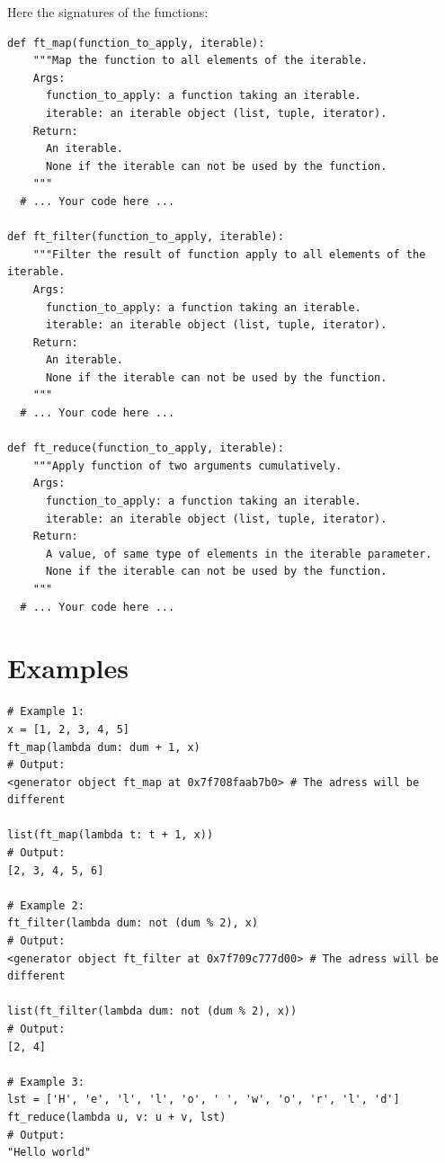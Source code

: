 \documentclass{42-en}
\begin{document}
Here the signatures of the functions:

\begin{verbatim}
def ft_map(function_to_apply, iterable):
	"""Map the function to all elements of the iterable.
	Args:
	  function_to_apply: a function taking an iterable.
	  iterable: an iterable object (list, tuple, iterator).
	Return:
	  An iterable.
	  None if the iterable can not be used by the function.
	"""
  # ... Your code here ...

def ft_filter(function_to_apply, iterable):
	"""Filter the result of function apply to all elements of the iterable.
	Args:
	  function_to_apply: a function taking an iterable.
	  iterable: an iterable object (list, tuple, iterator).
	Return:
	  An iterable.
	  None if the iterable can not be used by the function.
	"""
  # ... Your code here ...

def ft_reduce(function_to_apply, iterable):
	"""Apply function of two arguments cumulatively.
	Args:
	  function_to_apply: a function taking an iterable.
	  iterable: an iterable object (list, tuple, iterator).
	Return:
	  A value, of same type of elements in the iterable parameter.
	  None if the iterable can not be used by the function.
	"""
  # ... Your code here ...
\end{verbatim}

\section*{Examples}

\begin{verbatim}
# Example 1:
x = [1, 2, 3, 4, 5]
ft_map(lambda dum: dum + 1, x)
# Output:
<generator object ft_map at 0x7f708faab7b0> # The adress will be different

list(ft_map(lambda t: t + 1, x))
# Output:
[2, 3, 4, 5, 6]

# Example 2:
ft_filter(lambda dum: not (dum % 2), x)
# Output:
<generator object ft_filter at 0x7f709c777d00> # The adress will be different

list(ft_filter(lambda dum: not (dum % 2), x))
# Output:
[2, 4]

# Example 3:
lst = ['H', 'e', 'l', 'l', 'o', ' ', 'w', 'o', 'r', 'l', 'd']
ft_reduce(lambda u, v: u + v, lst)
# Output:
"Hello world"
\end{verbatim}
\end{document}
